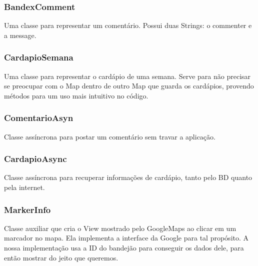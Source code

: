 \subsubsection{BandexComment}
Uma classe para representar um comentário. Possui duas Strings: o commenter e a message.

\subsubsection{CardapioSemana}
Uma classe para representar o cardápio de uma semana. Serve para não precisar se preocupar com o Map dentro de outro Map que guarda os cardápios, provendo métodos para um uso mais intuitivo no código.

\subsubsection{ComentarioAsyn}
Classe assíncrona para postar um comentário sem travar a aplicação.

\subsubsection{CardapioAsync}
Classe assíncrona para recuperar informações de cardápio, tanto pelo BD quanto pela internet.

\subsubsection{MarkerInfo}
Classe auxiliar que cria o View mostrado pelo GoogleMaps ao clicar em um marcador no mapa. Ela implementa a interface da Google para tal propósito.
A nossa implementação usa a ID do bandejão para conseguir os dados dele, para então mostrar do jeito que queremos.




